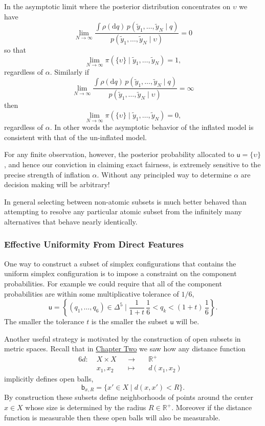 \documentclass[
  letterpaper,
  DIV=11,
  numbers=noendperiod]{scrartcl}
\begin{document}
In the asymptotic limit where the posterior distribution concentrates on
\(\upsilon\) we have \[
\lim_{N \rightarrow \infty}
\frac{ \int \rho( \mathrm{d} q) \,
            p(\tilde{y}_{1}, \ldots, \tilde{y}_{N} \mid q) }
     { p(\tilde{y}_{1}, \ldots, \tilde{y}_{N} \mid \upsilon ) }
=
0
\] so that \[
\lim_{N \rightarrow \infty}
\pi( \{ \upsilon \} \mid \tilde{y}_{1}, \ldots, \tilde{y}_{N}) = 1,
\] regardless of \(\alpha\). Similarly if \[
\lim_{N \rightarrow \infty}
\frac{ \int \rho( \mathrm{d} q) \,
            p(\tilde{y}_{1}, \ldots, \tilde{y}_{N} \mid q) }
     { p(\tilde{y}_{1}, \ldots, \tilde{y}_{N} \mid \upsilon ) }
=
\infty
\] then \[
\lim_{N \rightarrow \infty}
\pi( \{ \upsilon \} \mid \tilde{y}_{1}, \ldots, \tilde{y}_{N}) = 0,
\] regardless of \(\alpha\). In other words the asymptotic behavior of
the inflated model is consistent with that of the un-inflated model.

For any finite observation, however, the posterior probability allocated
to \(\mathsf{u} = \{ \upsilon \}\), and hence our conviction in claiming
exact fairness, is extremely sensitive to the precise strength of
inflation \(\alpha\). Without any principled way to determine \(\alpha\)
are decision making will be arbitrary!

In general selecting between non-atomic subsets is much better behaved
than attempting to resolve any particular atomic subset from the
infinitely many alternatives that behave nearly identically.

\subsubsection{Effective Uniformity From Direct
Features}\label{sec:effective_direct}

One way to construct a subset of simplex configurations that contains
the uniform simplex configuration is to impose a constraint on the
component probabilities. For example we could require that all of the
component probabilities are within some multiplicative tolerance of
\(1/6\), \[
\mathsf{u} =
\left\{ (q_{1}, \ldots, q_{6}) \in \Delta^{5} \mid
        \frac{1}{1 + t} \, \frac{1}{6}
        < q_{k} <
        (1 + t) \, \frac{1}{6} \right\}.
\] The smaller the tolerance \(t\) is the smaller the subset
\(\mathsf{u}\) will be.

Another useful strategy is motivated by the construction of open subsets
in metric spaces. Recall that in
\href{https://betanalpha.github.io/assets/chapters_html/spaces.html}{Chapter
Two} we saw how any distance function \begin{alignat*}{6}
d :\; & X \times X & &\rightarrow& \; & \mathbb{R}^{+} &
\\
& x_{1}, x_{2} & &\mapsto& & d(x_{1}, x_{2}) &
\end{alignat*} implicitly defines open balls, \[
\mathsf{b}_{x, R}
=
\{ x' \in X \mid d(x, x') < R \}.
\] By construction these subsets define neighborhoods of points around
the center \(x \in X\) whose size is determined by the radius
\(R \in \mathbb{R}^{+}\). Moreover if the distance function is
measurable then these open balls will also be measurable.
\end{document}
